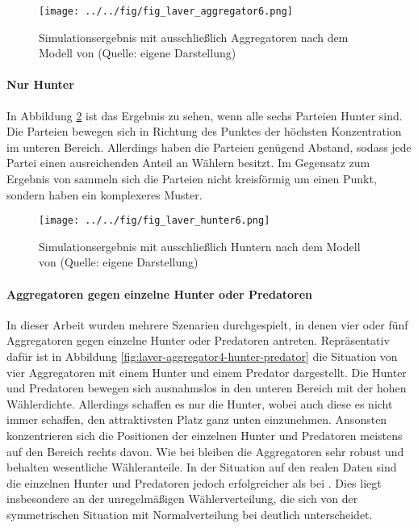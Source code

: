 \begin{figure}[htb]
	\centering
	\texttt{[image: ../../fig/fig\_laver\_aggregator6.png]}
	\caption{Simulationsergebnis mit ausschließlich Aggregatoren nach dem Modell von \citet{laver2005policy} (Quelle: eigene Darstellung)}
	\label{fig:laver-aggregator6}
\end{figure}

\paragraph{Nur Hunter}

In Abbildung \ref{fig:laver-hunter6} ist das Ergebnis zu sehen, wenn alle sechs Parteien Hunter sind. Die Parteien bewegen sich in Richtung des Punktes der höchsten Konzentration im unteren Bereich. Allerdings haben die Parteien genügend Abstand, sodass jede Partei einen ausreichenden Anteil an Wählern besitzt. Im Gegensatz zum Ergebnis von \citet{laver2005policy} sammeln sich die Parteien nicht kreisförmig um einen Punkt, sondern haben ein komplexeres Muster.

\begin{figure}[htb]
	\centering
	\texttt{[image: ../../fig/fig\_laver\_hunter6.png]}
	\caption{Simulationsergebnis mit ausschließlich Huntern nach dem Modell von \citet{laver2005policy} (Quelle: eigene Darstellung)}
	\label{fig:laver-hunter6}
\end{figure}

\paragraph{Aggregatoren gegen einzelne Hunter oder Predatoren}

In dieser Arbeit wurden mehrere Szenarien durchgespielt, in denen vier oder fünf Aggregatoren gegen einzelne Hunter oder Predatoren antreten.
Repräsentativ dafür ist in Abbildung \ref{fig:laver-aggregator4-hunter-predator} die Situation von vier Aggregatoren mit einem Hunter und einem Predator dargestellt.
Die Hunter und Predatoren bewegen sich ausnahmslos in den unteren Bereich mit der hohen Wählerdichte.
Allerdings schaffen es nur die Hunter, wobei auch diese es nicht immer schaffen, den attraktivsten Platz ganz unten einzunehmen.
Ansonsten konzentrieren sich die Positionen der einzelnen Hunter und Predatoren meistens auf den Bereich rechts davon.
Wie bei \citet{laver2005policy} bleiben die Aggregatoren sehr robust und behalten wesentliche Wähleranteile.
In der Situation auf den realen Daten sind die einzelnen Hunter und Predatoren jedoch erfolgreicher als bei \citet{laver2005policy}.
Dies liegt insbesondere an der unregelmäßigen Wählerverteilung, die sich von der symmetrischen Situation mit Normalverteilung bei \citet{laver2005policy} deutlich unterscheidet.


